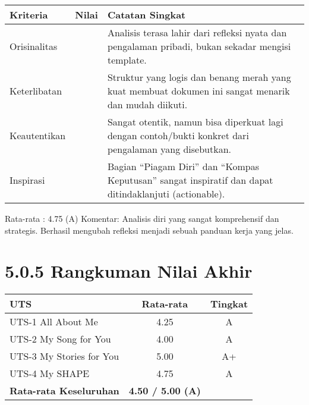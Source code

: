 \documentclass[
  letterpaper,
  DIV=11,
  numbers=noendperiod]{scrreprt}
\begin{document}
\begin{longtable}[]{@{}
  >{\raggedright\arraybackslash}p{}
  >{\centering\arraybackslash}p{}
  >{\raggedright\arraybackslash}p{}@{}}
\toprule\noalign{}
\begin{minipage}[b]{\linewidth}\raggedright
Kriteria
\end{minipage} & \begin{minipage}[b]{\linewidth}\centering
Nilai
\end{minipage} & \begin{minipage}[b]{\linewidth}\raggedright
Catatan Singkat
\end{minipage} \\
\midrule\noalign{}
\endhead
\bottomrule\noalign{}
\endlastfoot
Orisinalitas & 5 & Analisis terasa lahir dari refleksi nyata dan
pengalaman pribadi, bukan sekadar mengisi template. \\
Keterlibatan & 5 & Struktur yang logis dan benang merah yang kuat
membuat dokumen ini sangat menarik dan mudah diikuti. \\
Keautentikan & 4 & Sangat otentik, namun bisa diperkuat lagi dengan
contoh/bukti konkret dari pengalaman yang disebutkan. \\
Inspirasi & 5 & Bagian ``Piagam Diri'' dan ``Kompas Keputusan'' sangat
inspiratif dan dapat ditindaklanjuti (actionable). \\
\end{longtable}

Rata-rata : 4.75 (A) Komentar: Analisis diri yang sangat komprehensif
dan strategis. Berhasil mengubah refleksi menjadi sebuah panduan kerja
yang jelas.

\section{5.0.5 Rangkuman Nilai Akhir}\label{rangkuman-nilai-akhir}

\begin{longtable}[]{@{}lcc@{}}
\toprule\noalign{}
UTS & Rata-rata & Tingkat \\
\midrule\noalign{}
\endhead
\bottomrule\noalign{}
\endlastfoot
UTS-1 All About Me & 4.25 & A \\
UTS-2 My Song for You & 4.00 & A \\
UTS-3 My Stories for You & 5.00 & A+ \\
UTS-4 My SHAPE & 4.75 & A \\
\textbf{Rata-rata Keseluruhan} & \textbf{4.50 / 5.00 (A)} & \\
\end{longtable}
\end{document}
